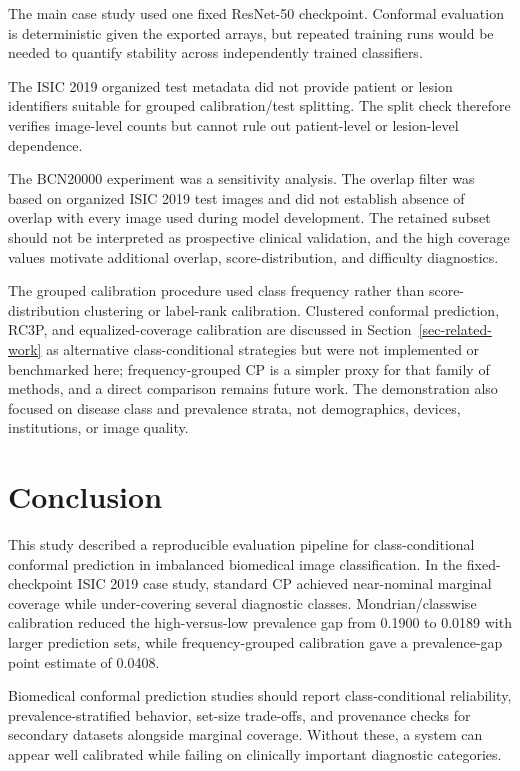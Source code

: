 ﻿\documentclass[preprint,12pt]{elsarticle}
\begin{document}
The main case study used one fixed ResNet-50 checkpoint. Conformal evaluation is deterministic given the exported arrays, but repeated training runs would be needed to quantify stability across independently trained classifiers.

The ISIC 2019 organized test metadata did not provide patient or lesion identifiers suitable for grouped calibration/test splitting. The split check therefore verifies image-level counts but cannot rule out patient-level or lesion-level dependence.

The BCN20000 experiment was a sensitivity analysis. The overlap filter was based on organized ISIC 2019 test images and did not establish absence of overlap with every image used during model development. The retained subset should not be interpreted as prospective clinical validation, and the high coverage values motivate additional overlap, score-distribution, and difficulty diagnostics.

The grouped calibration procedure used class frequency rather than score-distribution clustering or label-rank calibration. Clustered conformal prediction, RC3P, and equalized-coverage calibration are discussed in Section~\ref{sec-related-work} as alternative class-conditional strategies but were not implemented or benchmarked here; frequency-grouped CP is a simpler proxy for that family of methods, and a direct comparison remains future work. The demonstration also focused on disease class and prevalence strata, not demographics, devices, institutions, or image quality.

\section{Conclusion}
\label{sec-conclusion}

This study described a reproducible evaluation pipeline for class-conditional conformal prediction in imbalanced biomedical image classification. In the fixed-checkpoint ISIC 2019 case study, standard CP achieved near-nominal marginal coverage while under-covering several diagnostic classes. Mondrian/classwise calibration reduced the high-versus-low prevalence gap from 0.1900 to 0.0189 with larger prediction sets, while frequency-grouped calibration gave a prevalence-gap point estimate of 0.0408.

Biomedical conformal prediction studies should report class-conditional reliability, prevalence-stratified behavior, set-size trade-offs, and provenance checks for secondary datasets alongside marginal coverage. Without these, a system can appear well calibrated while failing on clinically important diagnostic categories.
\end{document}
